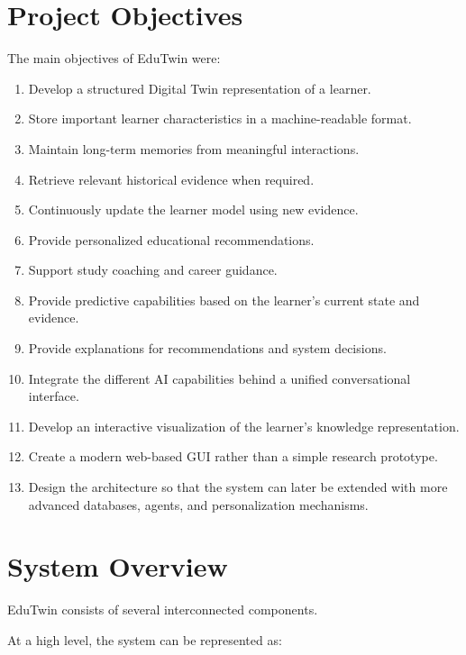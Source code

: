 \documentclass[12pt,a4paper]{article}
\begin{document}
\section{Project Objectives}
The main objectives of EduTwin were:
\begin{enumerate}[noitemsep,topsep=2pt]
    \item Develop a structured Digital Twin representation of a learner.
    \item Store important learner characteristics in a machine-readable format.
    \item Maintain long-term memories from meaningful interactions.
    \item Retrieve relevant historical evidence when required.
    \item Continuously update the learner model using new evidence.
    \item Provide personalized educational recommendations.
    \item Support study coaching and career guidance.
    \item Provide predictive capabilities based on the learner's current state and evidence.
    \item Provide explanations for recommendations and system decisions.
    \item Integrate the different AI capabilities behind a unified conversational interface.
    \item Develop an interactive visualization of the learner's knowledge representation.
    \item Create a modern web-based GUI rather than a simple research prototype.
    \item Design the architecture so that the system can later be extended with more advanced databases, agents, and personalization mechanisms.
\end{enumerate}

\section{System Overview}
EduTwin consists of several interconnected components.

At a high level, the system can be represented as:
\end{document}
